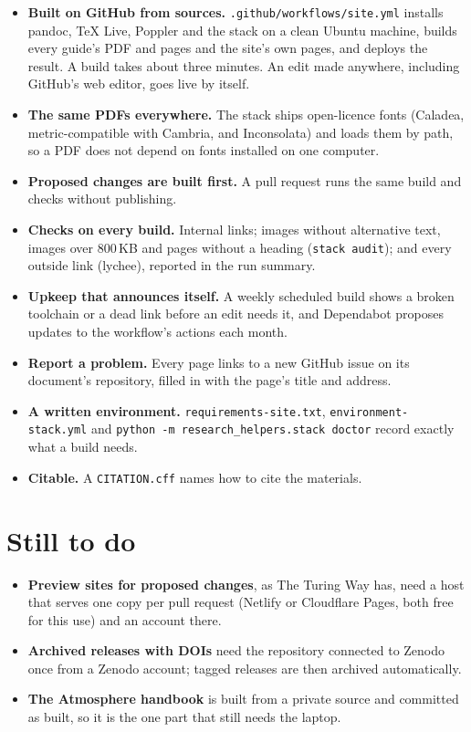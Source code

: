 \begin{itemize}
\item \textbf{Built on GitHub from sources.} \texttt{.github/workflows/site.yml} installs pandoc, TeX Live, Poppler and the stack on a clean Ubuntu machine, builds every guide's PDF and pages and the site's own pages, and deploys the result. A build takes about three minutes. An edit made anywhere, including GitHub's web editor, goes live by itself.
\item \textbf{The same PDFs everywhere.} The stack ships open-licence fonts (Caladea, metric-compatible with Cambria, and Inconsolata) and loads them by path, so a PDF does not depend on fonts installed on one computer.
\item \textbf{Proposed changes are built first.} A pull request runs the same build and checks without publishing.
\item \textbf{Checks on every build.} Internal links; images without alternative text, images over 800\,KB and pages without a heading (\texttt{stack audit}); and every outside link (lychee), reported in the run summary.
\item \textbf{Upkeep that announces itself.} A weekly scheduled build shows a broken toolchain or a dead link before an edit needs it, and Dependabot proposes updates to the workflow's actions each month.
\item \textbf{Report a problem.} Every page links to a new GitHub issue on its document's repository, filled in with the page's title and address.
\item \textbf{A written environment.} \texttt{requirements-site.txt}, \texttt{environment-stack.yml} and \texttt{python -m research\_helpers.stack doctor} record exactly what a build needs.
\item \textbf{Citable.} A \texttt{CITATION.cff} names how to cite the materials.
\end{itemize}

\section{Still to do}

\begin{itemize}
\item \textbf{Preview sites for proposed changes}, as The Turing Way has, need a host that serves one copy per pull request (Netlify or Cloudflare Pages, both free for this use) and an account there.
\item \textbf{Archived releases with DOIs} need the repository connected to Zenodo once from a Zenodo account; tagged releases are then archived automatically.
\item \textbf{The Atmosphere handbook} is built from a private source and committed as built, so it is the one part that still needs the laptop.
\end{itemize}
